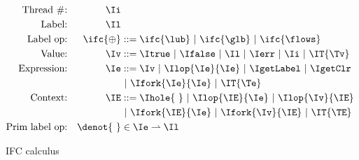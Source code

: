 \begin{figure}[h]
\begin{align*}
\textrm{Thread \#:}   && \Ii          &   \\
\textrm{Label:}       && \Il          &   \\
\textrm{Label op:}    && \ifc{\oplus} & ::=  \ifc{\lub}
                                        \ |\ \ifc{\glb}
                                        \ |\ \ifc{\flows}\\
\textrm{Value:}       && \Iv          & ::=  \Itrue 
                                        \ |\ \Ifalse
                                        \ |\ \Il
                                        \ |\ \Ierr
                                        \ |\ \Ii
                                        \ |\ \IT{\Tv}\\
\textrm{Expression:}  && \Ie          & ::=  \Iv
                                        \ |\ \Ilop{\Ie}{\Ie}
                                        \ |\ \IgetLabel
                                        \ |\ \IgetClr\\&&&
                                        \ |\ \Ifork{\Ie}{\Ie}
                                        \ |\ \IT{\Te}\\
\textrm{Context:}     && \IE          & ::=  \Ihole{\ }
                                        \ |\ \Ilop{\IE}{\Ie}
                                        \ |\ \Ilop{\Iv}{\IE}\\&&&
                                        \ |\ \Ifork{\IE}{\Ie}
                                        \ |\ \Ifork{\Iv}{\IE}
                                        \ |\ \IT{\TE}\\
\textrm{Prim label op:} && \denot{\ }   & \in \Ie \rightharpoonup \Il \\
\end{align*}

\caption{IFC calculus}
\end{figure}

